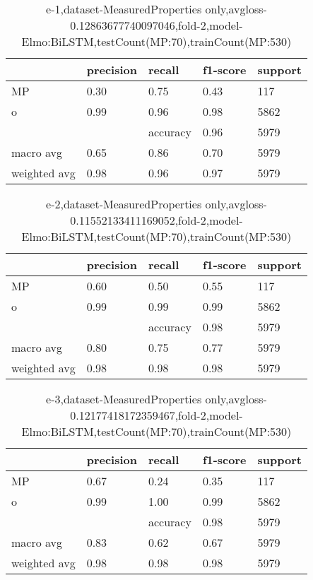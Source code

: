 \begin{table}[!ht] 
\centering
\caption{e-1,dataset-MeasuredProperties only,avgloss-0.12863677740097046,fold-2,model-Elmo:BiLSTM,testCount(MP:70),trainCount(MP:530)}\label{e-1data-mpS.tsv}
\begin{tabularx}{300pt}{|X|X|X|X|X|}
\hline
&precision&recall&f1-score&support\\
\hline
MP&0.30&0.75&0.43&117\\
\hline
o&0.99&0.96&0.98&5862\\
\hline
&&accuracy&0.96&5979\\
\hline
macro avg&0.65&0.86&0.70&5979\\
\hline
weighted avg&0.98&0.96&0.97&5979\\
\hline
\end{tabularx}
\end{table}
\begin{table}[!ht] 
\centering
\caption{e-2,dataset-MeasuredProperties only,avgloss-0.11552133411169052,fold-2,model-Elmo:BiLSTM,testCount(MP:70),trainCount(MP:530)}\label{e-2data-mpS.tsv}
\begin{tabularx}{300pt}{|X|X|X|X|X|}
\hline
&precision&recall&f1-score&support\\
\hline
MP&0.60&0.50&0.55&117\\
\hline
o&0.99&0.99&0.99&5862\\
\hline
&&accuracy&0.98&5979\\
\hline
macro avg&0.80&0.75&0.77&5979\\
\hline
weighted avg&0.98&0.98&0.98&5979\\
\hline
\end{tabularx}
\end{table}
\begin{table}[!ht] 
\centering
\caption{e-3,dataset-MeasuredProperties only,avgloss-0.12177418172359467,fold-2,model-Elmo:BiLSTM,testCount(MP:70),trainCount(MP:530)}\label{e-3data-mpS.tsv}
\begin{tabularx}{300pt}{|X|X|X|X|X|}
\hline
&precision&recall&f1-score&support\\
\hline
MP&0.67&0.24&0.35&117\\
\hline
o&0.99&1.00&0.99&5862\\
\hline
&&accuracy&0.98&5979\\
\hline
macro avg&0.83&0.62&0.67&5979\\
\hline
weighted avg&0.98&0.98&0.98&5979\\
\hline
\end{tabularx}
\end{table}
